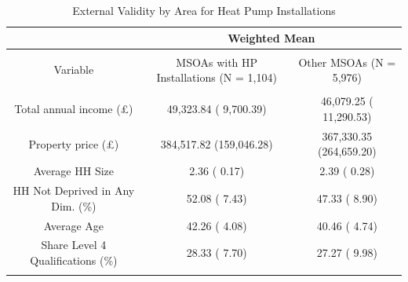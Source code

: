
\begin{table}[!htbp] \centering 
  \caption{External Validity by Area for Heat Pump Installations} 
  \label{tab:msoa_stats} 
\begin{tabular}{@{\extracolsep{5pt}} ccc} 
\\[-1.8ex]\hline\hline 
 & \multicolumn{2}{c}{Weighted Mean} \\
\hline \\[-1.8ex] 
Variable & MSOAs with HP Installations (N = 1,104) & Other MSOAs (N = 5,976) \\ 
\hline \\[-1.8ex] 
Total annual income (£) &  49,323.84 (  9,700.39) &  46,079.25 ( 11,290.53) \\ 
Property price (£) & 384,517.82 (159,046.28) & 367,330.35 (264,659.20) \\ 
Average HH Size &       2.36 (      0.17) &       2.39 (      0.28) \\ 
HH Not Deprived in Any Dim. (\%) &      52.08 (      7.43) &      47.33 (      8.90) \\ 
Average Age &      42.26 (      4.08) &      40.46 (      4.74) \\ 
Share Level 4 Qualifications (\%) &      28.33 (      7.70) &      27.27 (      9.98) \\ 
\hline\hline \\[-1.8ex] 
\end{tabular} 
\end{table} 
